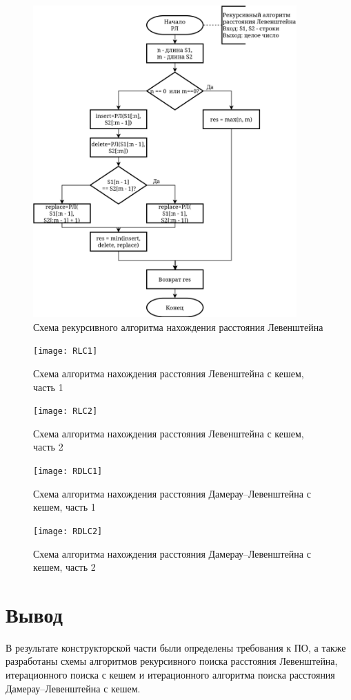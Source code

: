 \begin{figure}[h]
	\centering
	\includegraphics[width=0.9\textwidth]{RL}
	\caption{Схема рекурсивного алгоритма нахождения расстояния Левенштейна}
	\label{fig:RL}
\end{figure}

\begin{figure}[h]
	\centering
	\texttt{[image: RLС1]}
	\caption{Схема алгоритма нахождения расстояния Левенштейна с кешем, часть 1}
	\label{fig:RLC1}
\end{figure}

\begin{figure}[h]
	\centering
	\texttt{[image: RLC2]}
	\caption{Схема алгоритма нахождения расстояния Левенштейна с кешем, часть 2}
	\label{fig:RLC2}
\end{figure}

\begin{figure}[h]
	\centering
	\texttt{[image: RDLC1]}
	\caption{Схема алгоритма нахождения расстояния Дамерау–Левенштейна с кешем, часть 1}
	\label{fig:RDLC1}
\end{figure}


\begin{figure}[t]
	\centering
	\texttt{[image: RDLC2]}
	\caption{Схема алгоритма нахождения расстояния Дамерау–Левенштейна с кешем, часть 2}
	\label{fig:RDLC2}
\end{figure}

\clearpage


\section{Вывод}

В результате конструкторской части были определены требования к ПО, а также разработаны схемы алгоритмов рекурсивного поиска расстояния Левенштейна, итерационного поиска с кешем и итерационного алгоритма поиска расстояния Дамерау–Левенштейна с кешем.

\clearpage
